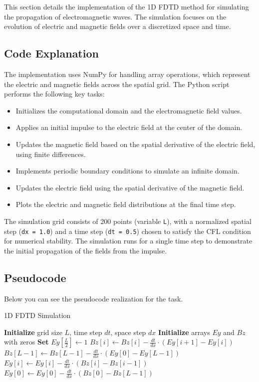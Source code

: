 \documentclass{article}[a4paper]
\begin{document}
This section details the implementation of the 1D FDTD method for simulating the propagation of electromagnetic waves. The simulation focuses on the evolution of electric and magnetic fields over a discretized space and time.

\subsection{Code Explanation}
The implementation uses NumPy for handling array operations, which represent the electric and magnetic fields across the spatial grid. The Python script performs the following key tasks:
\begin{itemize}
    \item Initializes the computational domain and the electromagnetic field values.
    \item Applies an initial impulse to the electric field at the center of the domain.
    \item Updates the magnetic field based on the spatial derivative of the electric field, using finite differences.
    \item Implements periodic boundary conditions to simulate an infinite domain.
    \item Updates the electric field using the spatial derivative of the magnetic field.
    \item Plots the electric and magnetic field distributions at the final time step.
\end{itemize}

The simulation grid consists of 200 points (variable \texttt{L}), with a normalized spatial step (\texttt{dx = 1.0}) and a time step (\texttt{dt = 0.5}) chosen to satisfy the CFL condition for numerical stability. The simulation runs for a single time step to demonstrate the initial propagation of the fields from the impulse.

\subsection{Pseudocode}

Below you can see the pseudocode realization for the task.

\begin{algorithm}[H]
\caption{1D FDTD Simulation}
\begin{algorithmic}[1]
\State \textbf{Initialize} grid size $L$, time step $dt$, space step $dx$
\State \textbf{Initialize} arrays $Ey$ and $Bz$ with zeros
\State \textbf{Set} $Ey[\frac{L}{2}] \gets 1$ 
        \State $Bz[i] \gets Bz[i] - \frac{dt}{dx} \cdot (Ey[i+1] - Ey[i])$
    \EndFor
    \State $Bz[L-1] \gets Bz[L-1] - \frac{dt}{dx} \cdot (Ey[0] - Ey[L-1])$ 
        \State $Ey[i] \gets Ey[i] - \frac{dt}{dx} \cdot (Bz[i] - Bz[i-1])$
    \EndFor
    \State $Ey[0] \gets Ey[0] - \frac{dt}{dx} \cdot (Bz[0] - Bz[L-1])$ 
\EndFor
\end{algorithmic}
\end{algorithm}
\end{document}
